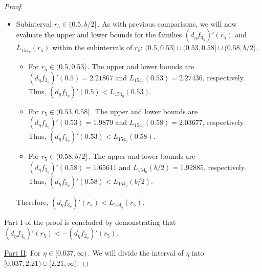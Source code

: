 \documentclass[final,11pt]{article}
\numberwithin{equation}{section}
\theoremstyle{definition}
\begin{document}
\begin{proof}
\begin{itemize}
\begin{itemize}
\item Subinterval $r_{5}\in(0.5,b/2]$\,.  As with previous comparisons, we will now evaluate the upper and lower bounds for the families $(d_{\eta}f_{3_{\eta}})'(r_{5})$ and $ L_{154_{\eta}}(r_{5})$ within the subintervals of $r_{5}$: $(0.5,0.53]\cup(0.53,0.58]\cup(0.58,b/2]$\,. 
\begin{itemize}
\item For $r_{5}\in(0.5,0.53]$\,. The upper and lower bounds are  $(d_{\eta}f_{3_{\eta}})'(0.5)=2.21867$ and $L_{154_{0}}(0.53)=2.27436$, respectively. Thus, $(d_{\eta}f_{3_{\eta}})'(0.5)<L_{154_{\eta}}(0.53)$.

\item For $r_{5}\in(0.53,0.58]$\,.  The upper and lower bounds are  $(d_{\eta}f_{3_{\eta}})'(0.53)=1.9879$ and $L_{154_{0}}(0.58)=2.03677$, respectively. Thus, $(d_{\eta}f_{3_{\eta}})'(0.53)<L_{154_{\eta}}(0.58)$.

\item For $r_{5}\in(0.58,b/2]$\,.  The upper and lower bounds are  $(d_{\eta}f_{3_{\eta}})'(0.58)=1.65611$ and $L_{154_{0}}(b/2)=1.92885$, respectively. Thus, $(d_{\eta}f_{3_{\eta}})'(0.58)<L_{154_{\eta}}(b/2)$.
\end{itemize}
Therefore, $(d_{\eta}f_{3_{\eta}})'(r_{5})<L_{154_{\eta}}(r_{5})$.
\end{itemize}
Part I of the proof is concluded by demonstrating that $(d_{\eta}f_{3_{\eta}})'(r_{5})<-(d_{\eta}f_{2_{\eta}})'(r_{5})$.
\end{itemize}

\item \underline{Part II}:  For $\eta\in[0.037,\infty)$\,. We will divide the interval of $\eta$ into $[0.037,2.21)\cup[2.21,\infty)$.


\end{proof}
\end{document}
